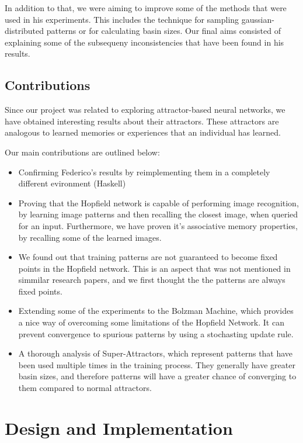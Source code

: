 \documentclass[11pt,a4paper,oneside]{report}
\begin{document}
In addition to that, we were aiming to improve some of the methods that were used in his experiments. This includes the technique for sampling gaussian-distributed patterns or for calculating basin sizes. Our final aims consisted of explaining some of the subsequeny inconsistencies that have been found in his results. 

\section{Contributions}

Since our project was related to exploring attractor-based neural networks, we have obtained interesting results about their attractors. These attractors are analogous to learned memories or experiences that an individual has learned. 


Our main contributions are outlined below:
\begin{itemize}
\item Confirming Federico's results by reimplementing them in a completely different evironment (Haskell)
\item Proving that the Hopfield network is capable of performing image recognition, by learning image patterns and then recalling the closest image, when queried for an input. Furthermore, we have proven it's associative memory properties, by recalling some of the learned images. 
\item We found out that training patterns are not guaranteed to become fixed points in the Hopfield network. This is an aspect that was not mentioned in simmilar research papers, and we first thought the the patterns are always fixed points.
\item Extending some of the experiments to the Bolzman Machine, which provides a nice way of overcoming some limitations of the Hopfield Network. It can prevent convergence to spurious patterns by using a stochasting update rule. 
\item A thorough analysis of Super-Attractors, which represent patterns that have been used multiple times in the training process. They generally have greater basin sizes, and therefore patterns will have a greater chance of converging to them compared to normal attractors. 
\end{itemize}

\chapter{Design and Implementation}
\end{document}
